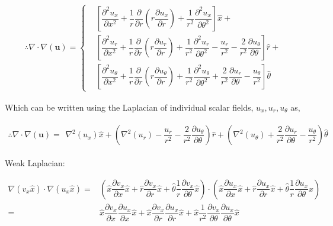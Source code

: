 \documentclass{kthreport}
\begin{document}
\begin{eqnarray}
	\therefore \nabla\cdot\nabla (\bm{u}) = \left\{
	\begin{split}
		& \left[\dfrac{\partial^{2}u_{x}}{\partial x^{2}} + \dfrac{1}{r}\dfrac{\partial }{\partial r}\left(r\dfrac{\partial u_{x}}{\partial r}\right) +  \dfrac{1}{r^{2}}\dfrac{\partial^{2} u_{x}}{\partial \theta^{2}}	\right]\hat{x} + \\
		& \left[\dfrac{\partial^{2}u_{r}}{\partial x^{2}} + \dfrac{1}{r}\dfrac{\partial }{\partial r}\left(r\dfrac{\partial u_{r}}{\partial r}\right) +\dfrac{1}{r^{2}}\dfrac{\partial^{2} u_{r}}{\partial \theta^{2}} - \dfrac{u_{r}}{r^{2}} - \dfrac{2}{r^{2}}\dfrac{\partial u_{\theta}}{\partial \theta}  \right]\hat{r}  +\\
		& \left[\dfrac{\partial^{2}u_{\theta}}{\partial x^{2}} + \dfrac{1}{r}\dfrac{\partial }{\partial r}\left(r\dfrac{\partial u_{\theta}}{\partial r}\right) + \dfrac{1}{r^{2}}\dfrac{\partial^{2} u_{\theta}}{\partial \theta^{2}} + \dfrac{2}{r^{2}}\dfrac{\partial u_{r}}{\partial \theta}   - \dfrac{u_{\theta}}{r^{2}} \right]\hat{\theta}  
	\end{split}\right. \label{eqn:vector_laplacian}
\end{eqnarray}

Which can be written using the Laplacian of individual scalar fields, $u_{x},u_{r},u_{\theta}$ as,

\begin{eqnarray}
	\therefore \nabla\cdot\nabla (\bm{u}) = 
\begin{split}
	 \nabla^{2}(u_{x}) \hat{x} + \left(\nabla^{2}(u_{r}) - \dfrac{u_{r}}{r^{2}} - \dfrac{2}{r^{2}}\dfrac{\partial u_{\theta}}{\partial \theta}  \right)\hat{r}  + 
	 \left( \nabla^{2}(u_{\theta}) + \dfrac{2}{r^{2}}\dfrac{\partial u_{r}}{\partial \theta}   - \dfrac{u_{\theta}}{r^{2}} \right)\hat{\theta}  
\end{split} \label{eqn:vector_laplacian_scalar}
\end{eqnarray}

Weak Laplacian:

\begin{eqnarray}
	\nabla(v_{x}\hat{x})\cdot\nabla (u_{x}\hat{x}) =& \left(\hat{x}\dfrac{\partial v_{x}}{\partial x} \hat{x} + \hat{r}\dfrac{\partial v_{x}}{\partial r}\hat{x} + \hat{\theta}\dfrac{1}{r}\dfrac{\partial v_{x}}{\partial \theta}\hat{x} \right) \cdot
	 \left(\hat{x}\dfrac{\partial u_{x}}{\partial x} \hat{x} + \hat{r}\dfrac{\partial u_{x}}{\partial r}\hat{x} + \hat{\theta}\dfrac{1}{r}\dfrac{\partial u_{x}}{\partial \theta}\hat{x} \right) \nonumber \\
	 =& \hat{x}\dfrac{\partial v_{x}}{\partial x}\dfrac{\partial u_{x}}{\partial x}\hat{x} + \hat{x}\dfrac{\partial v_{x}}{\partial r}\dfrac{\partial u_{x}}{\partial r}\hat{x} + \hat{x}\dfrac{1}{r^{2}}\dfrac{\partial v_{x}}{\partial \theta}\dfrac{\partial u_{x}}{\partial \theta}\hat{x} 
\end{eqnarray}
\end{document}
